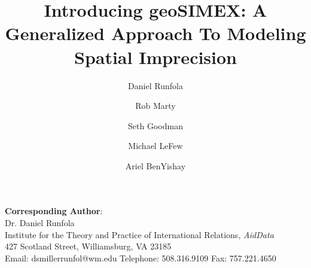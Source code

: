 


\author[1]{Daniel Runfola}
\author[1]{Rob Marty}
\author[1]{Seth Goodman}
\author[1]{Michael LeFew}
\author[2]{Ariel BenYishay}
\renewcommand\Authands{ and }

\title{Introducing geoSIMEX: A Generalized Approach To Modeling Spatial Imprecision}



\usepackage{Sweave}




\maketitle 
\begin{flushleft}
\textbf{Corresponding Author}:\\
Dr. Daniel Runfola\\
Institute for the Theory and Practice of International Relations, \emph{AidData}\\
427 Scotland Street, Williamsburg, VA 23185\\
Email: dsmillerrunfol@wm.edu
Telephone: 508.316.9109
Fax: 757.221.4650
\end{flushleft}

\newpage

\doublespacing

